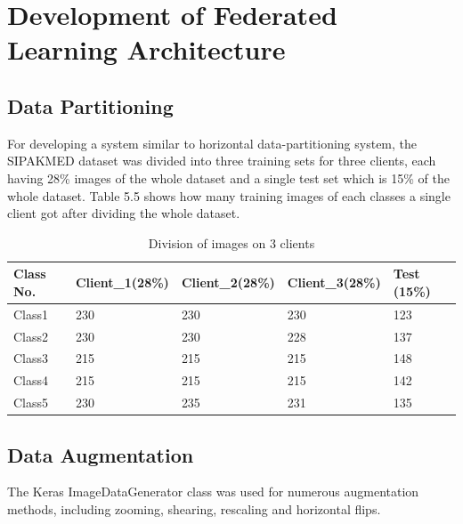 
\pagebreak

\section{Development of Federated Learning Architecture}
\subsection{Data Partitioning}
For developing a system similar to horizontal data-partitioning system, the SIPAKMED dataset was divided into three training sets for three clients, each having 28\% images of the whole dataset and a single test set which is 15\% of the whole dataset. Table 5.5 shows how many training images of each classes a single client got after dividing the whole dataset.    
\begin{table}[!ht]
\centering
    \caption{Division of images on 3 clients}
    \begin{tabular}{|l|l|l|l|l|}
    \hline
         Class No. & Client\_1(28\%)  & Client\_2(28\%) & Client\_3(28\%)  & Test (15\%) \\ 
         \hline
         Class1 & 230  & 230  &  230  &  123 \\ 
         \hline
         Class2 & 230  & 230  & 228  & 137   \\ 
         \hline
         Class3 & 215  & 215  & 215  & 148   \\ 
         \hline
         Class4 & 215  & 215  & 215  & 142   \\ 
         \hline
         Class5 & 230  & 235  & 231  & 135  \\ 
         \hline
    \end{tabular}
\end{table}

\subsection{Data Augmentation}
The Keras ImageDataGenerator class was used for numerous augmentation methods, including zooming, shearing, rescaling and horizontal flips.

